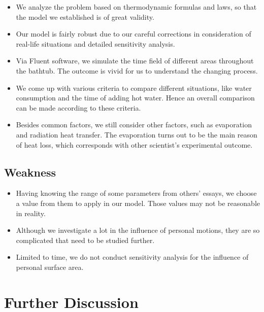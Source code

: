 \documentclass{mcmthesis}
\begin{document}
\begin{itemize}[leftmargin=*]
\item We analyze the problem based on thermodynamic formulas and laws, so that the model we established is of great validity.

\item Our model is fairly robust due to our careful corrections in consideration of real-life situations and detailed sensitivity analysis.

\item Via Fluent software, we simulate the time field of different areas throughout the bathtub. The outcome is vivid for us to understand the changing process.

\item We come up with various criteria to compare different situations, like water consumption and the time of adding hot water. Hence an overall comparison can be made according to these criteria.

\item Besides common factors, we still consider other factors, such as evaporation and radiation heat transfer. The evaporation turns out to be the main reason of heat loss, which corresponds with other scientist’s experimental outcome.
\end{itemize}

\subsection{Weakness}

\begin{itemize}[leftmargin=*]
\item Having knowing the range of some parameters from others’ essays, we choose a value from them to apply in our model. Those values may not be reasonable in reality.

\item Although we investigate a lot in the influence of personal motions, they are so complicated that need to be studied further.

\item Limited to time, we do not conduct sensitivity analysis for the influence of personal surface area.
\end{itemize}

\section{Further Discussion}
\end{document}
